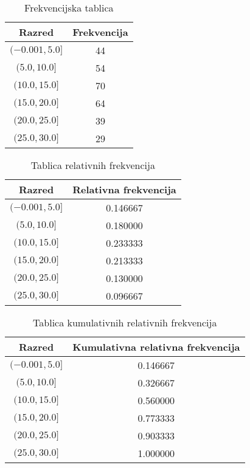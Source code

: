 \begin{table}[H]
\centering
\caption{Frekvencijska tablica}
\label{tab:frequency}
\begin{tabular}{|c|c|}
\hline
\textbf{Razred} & \textbf{Frekvencija} \\
\hline
$(-0.001, 5.0]$ & 44 \\
$(5.0, 10.0]$ & 54 \\
$(10.0, 15.0]$ & 70 \\
$(15.0, 20.0]$ & 64 \\
$(20.0, 25.0]$ & 39 \\
$(25.0, 30.0]$ & 29 \\
\hline
\end{tabular}
\end{table}

\begin{table}[H]
\centering
\caption{Tablica relativnih frekvencija}
\label{tab:relativeFrequency}
\begin{tabular}{|c|c|}
\hline
\textbf{Razred} & \textbf{Relativna frekvencija} \\
\hline
$(-0.001, 5.0]$ & 0.146667 \\
$(5.0, 10.0]$ & 0.180000 \\
$(10.0, 15.0]$ & 0.233333 \\
$(15.0, 20.0]$ & 0.213333 \\
$(20.0, 25.0]$ & 0.130000 \\
$(25.0, 30.0]$ & 0.096667 \\
\hline
\end{tabular}
\end{table}

\begin{table}[H]
\centering
\caption{Tablica kumulativnih relativnih frekvencija}
\label{tab:cumulativeRelativeFrequency}
\begin{tabular}{|c|c|}
\hline
\textbf{Razred} & \textbf{Kumulativna relativna frekvencija} \\
\hline
$(-0.001, 5.0]$ & 0.146667 \\
$(5.0, 10.0]$ & 0.326667 \\
$(10.0, 15.0]$ & 0.560000 \\
$(15.0, 20.0]$ & 0.773333 \\
$(20.0, 25.0]$ & 0.903333 \\
$(25.0, 30.0]$ & 1.000000 \\
\hline
\end{tabular}
\end{table}

